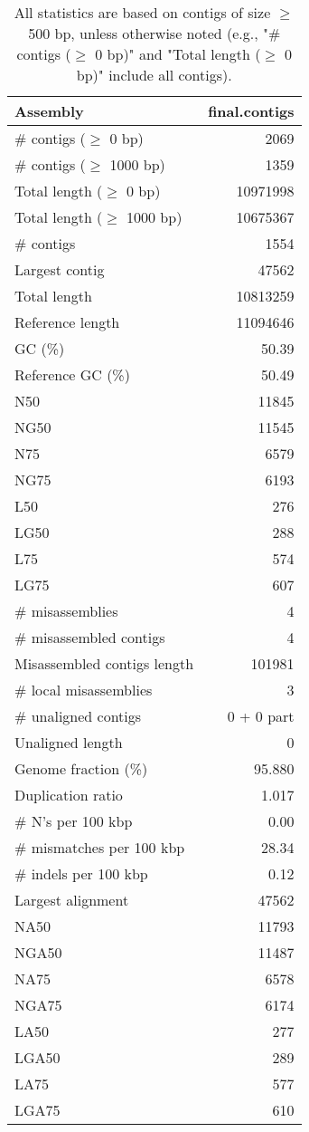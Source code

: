 \documentclass[12pt,a4paper]{article}
\begin{document}
\begin{table}[ht]
\begin{center}
\caption{All statistics are based on contigs of size $\geq$ 500 bp, unless otherwise noted (e.g., "\# contigs ($\geq$ 0 bp)" and "Total length ($\geq$ 0 bp)" include all contigs).}
\begin{tabular}{|l*{1}{|r}|}
\hline
Assembly & final.contigs \\ \hline
\# contigs ($\geq$ 0 bp) & 2069 \\ \hline
\# contigs ($\geq$ 1000 bp) & 1359 \\ \hline
Total length ($\geq$ 0 bp) & 10971998 \\ \hline
Total length ($\geq$ 1000 bp) & 10675367 \\ \hline
\# contigs & 1554 \\ \hline
Largest contig & 47562 \\ \hline
Total length & 10813259 \\ \hline
Reference length & 11094646 \\ \hline
GC (\%) & 50.39 \\ \hline
Reference GC (\%) & 50.49 \\ \hline
N50 & 11845 \\ \hline
NG50 & 11545 \\ \hline
N75 & 6579 \\ \hline
NG75 & 6193 \\ \hline
L50 & 276 \\ \hline
LG50 & 288 \\ \hline
L75 & 574 \\ \hline
LG75 & 607 \\ \hline
\# misassemblies & 4 \\ \hline
\# misassembled contigs & 4 \\ \hline
Misassembled contigs length & 101981 \\ \hline
\# local misassemblies & 3 \\ \hline
\# unaligned contigs & 0 + 0 part \\ \hline
Unaligned length & 0 \\ \hline
Genome fraction (\%) & 95.880 \\ \hline
Duplication ratio & 1.017 \\ \hline
\# N's per 100 kbp & 0.00 \\ \hline
\# mismatches per 100 kbp & 28.34 \\ \hline
\# indels per 100 kbp & 0.12 \\ \hline
Largest alignment & 47562 \\ \hline
NA50 & 11793 \\ \hline
NGA50 & 11487 \\ \hline
NA75 & 6578 \\ \hline
NGA75 & 6174 \\ \hline
LA50 & 277 \\ \hline
LGA50 & 289 \\ \hline
LA75 & 577 \\ \hline
LGA75 & 610 \\ \hline
\end{tabular}
\end{center}
\end{table}
\end{document}
